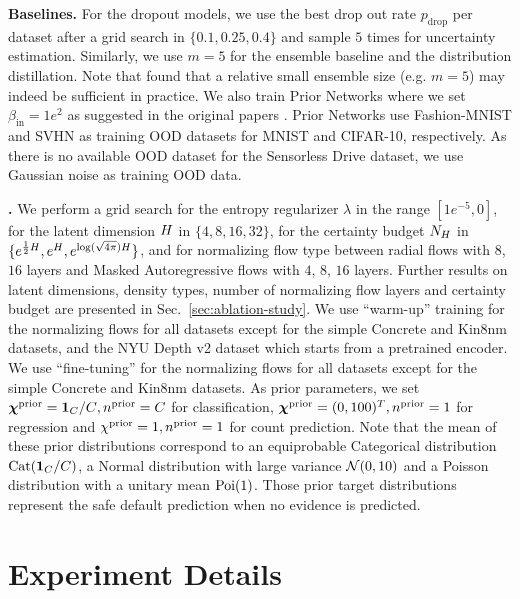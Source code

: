 \textbf{Baselines.} For the dropout models, we use the best drop out rate $p_{\text{drop}}$ per dataset after a grid search in $\{0.1, 0.25, 0.4\}$ and sample $5$ times for uncertainty estimation. Similarly, we use $m=5$ for the ensemble baseline and the distribution distillation. Note that \citet{dataset-shift} found that a relative small ensemble size (e.g. $m=5$) may indeed be sufficient in practice. We also train Prior Networks where we set $\beta_\text{in}=1e^2$ as suggested in the original papers \citep{priornet, reverse-kl}. Prior Networks use Fashion-MNIST and SVHN as training OOD datasets for MNIST and CIFAR-10, respectively. As there is no available OOD dataset for the Sensorless Drive dataset, we use Gaussian noise as training OOD data. 

\textbf{\NatPN{}.} We perform a grid search for the entropy regularizer $\lambda$ in the range $[1e^{-5}, 0]$, for the latent dimension $H$ in $\{4, 8, 16, 32\}$, for the certainty budget $N_H$ in $\{e^{\frac{1}{2}H}, e^{H}, e^{\log(\sqrt{4\pi})H}\}$, and for normalizing flow type between radial flows \citep{radialflow} with $8$, $16$ layers and Masked Autoregressive flows \citep{maf, made} with $4$, $8$, $16$ layers. Further results on latent dimensions, density types, number of normalizing flow layers and certainty budget are presented in Sec.~\ref{sec:ablation-study}. We use ``warm-up'' training for the normalizing flows for all datasets except for the simple Concrete and Kin8nm datasets, and the NYU Depth v2 dataset which starts from a pretrained encoder. We use ``fine-tuning'' for the normalizing flows for all datasets except for the simple Concrete and Kin8nm datasets. As prior parameters, we set ${\bm{\chi}^\text{prior}=\bm{1}_{C}/C}, {n^\text{prior}=C}$ for classification, ${\bm{\chi}^\text{prior}=(0, 100)^T}, n^\text{prior}=1$ for regression and $\chi^\text{prior}=1, n^\text{prior}=1$ for count prediction. Note that the mean of these prior distributions correspond to an equiprobable Categorical distribution $\operatorname{Cat}(\bm{1}_{C}/C)$, a Normal distribution with large variance $\operatorname{\mathcal{N}}(0, 10)$ and a Poisson distribution with a unitary mean $\operatorname{Poi}(1)$. Those prior target distributions represent the safe default prediction when no evidence is predicted.

\section{Experiment Details}
\label{sec:experiment}

